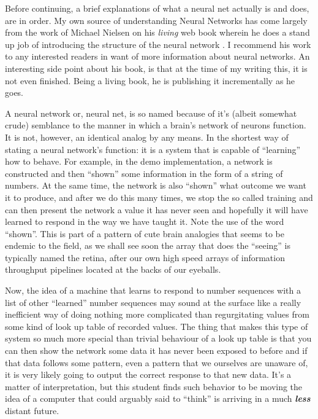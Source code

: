 \documentclass[a4paper,10pt]{article}
\let\oldemph\emph
\renewcommand{\emph}[1]{\textbf{\oldemph{#1}}}
\begin{document}
Before continuing, a brief explanations of what a neural net actually is and does, are in order.  My own source of
understanding Neural Networks has come largely from the work of Michael Nielsen on his \textit{living} web book wherein
he does a stand up job of introducing the structure of the neural network \cite{NetWeb}. I recommend his work to any
interested readers in want of more information about neural networks.
An interesting side point about his book, is that at the time of my writing this, it is not even finished.  Being a
living book, he is publishing it incrementally as he goes.

A neural network or, neural net, is so named because of it's (albeit somewhat crude) semblance to the manner in which a
brain's network of neurons function.  It is not, however, an identical analog by any means.  In the shortest way of
stating a neural network's function: it is a system that is capable of ``learning'' how to behave.  For example, in the
demo implementation, a network is constructed and then ``shown'' some information in the form of a string of numbers. 
At the same time, the network is also ``shown'' what outcome we want it to produce, and after we do this many times, we
stop the so called training and can then present the network a value it has never seen and hopefully it will have
learned to respond in the way we have taught it.  Note the use of the word ``shown''.  This is part of a pattern of
cute brain analogies that seems to be endemic to the field, as we shall see soon the array that does the ``seeing'' is
typically named the retina, after our own high speed arrays of information throughput pipelines located at the backs of
our eyeballs.

Now, the idea of a machine that learns to respond to number sequences with a list of other ``learned'' number sequences
may sound at the surface like a really inefficient way of doing nothing more complicated than regurgitating values from
some kind of look up table of recorded values.  The thing that makes this type of system so much more special than
trivial behaviour of a look up table is that you can then show the network some data it has never been exposed to
before and if that data follows some pattern, even a pattern that we ourselves are unaware of, it is very likely going
to output the correct response to that new data.  It's a matter of interpretation, but this student finds such behavior
to be moving the idea of a computer that could arguably said to ``think'' is arriving in a much \emph{less} distant
future.
\end{document}

